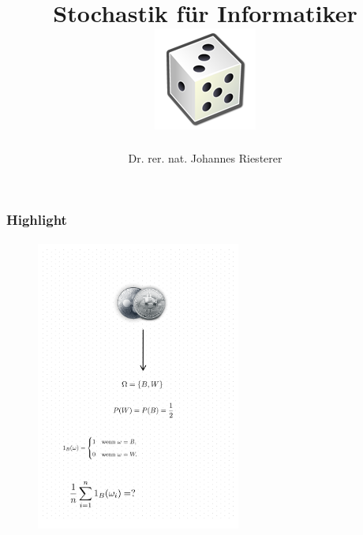 \documentclass{beamer}
\begin{document}
\title[Stochastik] %
{Stochastik für Informatiker
\\
\includegraphics[scale=0.5]{img/craps}
}
\subtitle{}
\author[Dr. Johannes Riesterer] %
{Dr.  rer. nat. Johannes Riesterer}

\date[KPT 2004] %
{}

\subject{Stochastik}

\begin{frame}
    \frametitle{Highlight}
\framesubtitle{}
\begin{figure}[htp]
      \centering
    \includegraphics[width=0.6\textwidth]{img/coinflip.png}
\end{figure}
 \end{frame}
\end{document}
